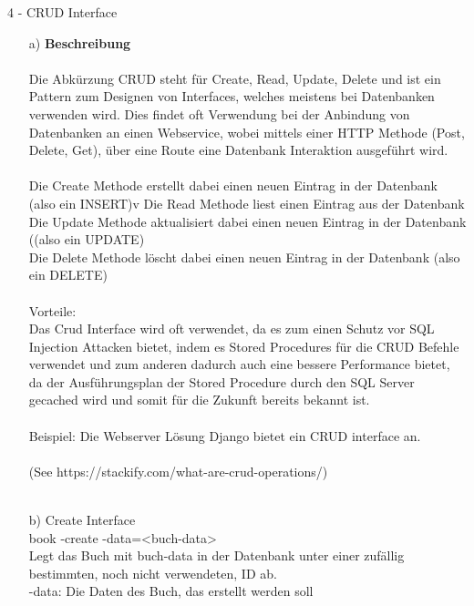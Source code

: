 \documentclass[a4paper]{article}
\begin{document}
\begin{exercise}{4 - CRUD Interface} 
\begin{itemize}
\item[a)]\textbf{Beschreibung}\\\\
Die Abkürzung CRUD steht für Create, Read, Update, Delete und ist ein Pattern zum
Designen von Interfaces, welches meistens bei Datenbanken verwenden wird.
Dies findet oft Verwendung bei der Anbindung von Datenbanken an einen Webservice,
wobei mittels einer HTTP Methode (Post, Delete, Get), über eine Route eine
Datenbank Interaktion ausgeführt wird.\\\\

Die Create Methode erstellt dabei einen neuen Eintrag in der Datenbank (also ein INSERT)v
Die Read Methode liest einen Eintrag aus der Datenbank\\
Die Update Methode aktualisiert dabei einen neuen Eintrag in der Datenbank ((also ein UPDATE)\\
Die Delete Methode löscht dabei einen neuen Eintrag in der Datenbank (also ein DELETE)\\\\

Vorteile:\\
Das Crud Interface wird oft verwendet, da es zum einen Schutz vor SQL Injection Attacken bietet, indem es Stored Procedures für die CRUD Befehle verwendet und zum anderen dadurch auch eine bessere Performance bietet, da der Ausführungsplan der Stored Procedure durch den SQL Server gecached wird und somit für die Zukunft bereits bekannt ist.\\\\

Beispiel:
Die Webserver Lösung Django bietet ein CRUD interface an.\\\\

(See https://stackify.com/what-are-crud-operations/)\\\\

\item[b)]
Create Interface\\
book -create -data=<buch-data>\\
  Legt das Buch mit buch-data in der Datenbank unter einer zufällig bestimmten, noch nicht verwendeten, ID ab.\\
  -data: Die Daten des Buch, das erstellt werden soll\\


\end{itemize}
\end{exercise}
\end{document}
